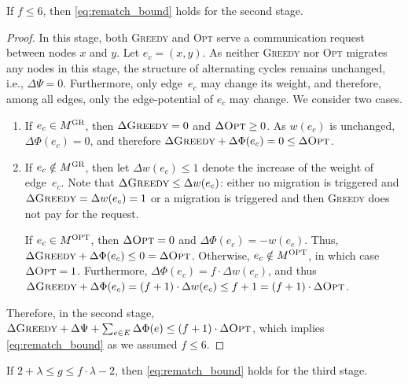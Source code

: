 \documentclass{siamart190516}
\newcommand{\GREEDY}{\textsc{Greedy}\xspace}
\newcommand{\MGREEDY}{M^\textsc{GR}}
\newcommand{\MOPT}{M^\textsc{OPT}}
\newcommand{\OPT}{\textsc{Opt}\xspace}
\begin{document}
\begin{lemma}
\label{lem:rematch_req}
If $f \leq 6$, then \eqref{eq:rematch_bound} holds for the second stage.
\end{lemma}

\begin{proof}
In this stage, both \GREEDY and \OPT serve a communication request between
nodes $x$ and $y$. Let $e_c = (x,y)$. As neither \GREEDY nor \OPT migrates any
nodes in this stage, the structure of alternating cycles remains
unchanged, i.e., $\Delta \Psi = 0$. Furthermore, only edge~$e_c$ may change its
weight, and therefore, among all edges, only the edge-potential of $e_c$ may
change. We consider two cases.
\begin{enumerate}

\item If $e_c \in \MGREEDY$, then $\Delta \GREEDY = 0$ and $\Delta \OPT \geq 0$. As
$w(e_c)$ is unchanged, $\Delta \Phi(e_c) = 0$, and therefore 
$\Delta \GREEDY + \Delta \Phi(e_c) = 0 \leq \Delta \OPT$. 

\item If $e_c \notin \MGREEDY$, then let $\Delta w(e_c) \leq 1$ denote the increase 
of the weight of edge~$e_c$. Note that $\Delta \GREEDY \leq \Delta w(e_c)$: 
either no migration is triggered and $\Delta \GREEDY = \Delta w(e_c) = 1$
or a migration is triggered and then \GREEDY does not pay for the request.

If $e_c \in \MOPT$, then $\Delta \OPT = 0$ and $\Delta \Phi(e_c) = -w(e_c)$.
Thus, $\Delta \GREEDY + \Delta \Phi(e_c) \leq 0 = \Delta \OPT$. Otherwise, 
$e_c \notin \MOPT$, in which case 
$\Delta \OPT = 1$. Furthermore, $\Delta \Phi(e_c) = f \cdot \Delta w(e_c)$,
and thus $\Delta \GREEDY + \Delta \Phi(e_c) = (f+1) \cdot \Delta w(e_c) \leq f+1 =
(f+1) \cdot \Delta \OPT$.
\end{enumerate}

Therefore, in the second stage, $\Delta \GREEDY + \Delta \Psi + \sum_{e \in E}
\Delta \Phi(e) \leq (f+1) \cdot \Delta \OPT$,
which implies \eqref{eq:rematch_bound} as we assumed $f \leq 6$.
\end{proof}


\begin{lemma}
\label{lem:greedy_swap}
If $2 + \lambda \leq g \leq f \cdot \lambda - 2$, 
then  \eqref{eq:rematch_bound} holds for the third stage.
\end{lemma}
\end{document}
